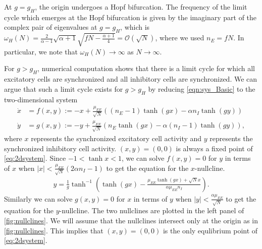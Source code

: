 \documentclass[11pt,reqno]{amsart}
\begin{document}
At $g = g_H$, the origin undergoes a Hopf bifurcation. The frequency of the limit cycle which emerges at the Hopf bifurcation is given by the imaginary part of the complex pair of eigenvalues at $g = g_H$, which is $\omega_H(N) = \frac{2}{\alpha-1}\sqrt{\alpha+1}\sqrt{f N- \frac{\alpha+1}{4}} = \mathcal{O}(\sqrt{N})$, where we used $n_E = f N$. In particular, we note that $\omega_H(N) \rightarrow \infty$ as $N \rightarrow \infty$.

For $g > g_H$, numerical computation shows that there is a limit cycle for which all excitatory cells are synchronized and all inhibitory cells are synchronized. We can argue that such a limit cycle exists for $g > g_H$ by reducing \cref{eqn:sys_Basic} to the two-dimensional system
\begin{equation}\label{eq:2dsystem}
\begin{aligned}
\dot{x} &= f(x, y) := -x + \frac{\mu_{EE}}{\sqrt{N}}\left((n_E - 1) \tanh(g x) - \alpha n_I \tanh(g y) \right) \\
\dot{y} &= g(x, y) := -y + \frac{\mu_{EE}}{\sqrt{N}}\left( n_E \tanh(g x) - \alpha (n_I - 1) \tanh(g y) \right), 
\end{aligned}
\end{equation}
where $x$ represents the synchronized excitatory cell activity and $y$ represents the synchronized inhibitory cell activity. $(x, y) = (0, 0)$ is always a fixed point of \cref{eq:2dsystem}. Since $-1 < \tanh x < 1$, we can solve $f(x, y) = 0$ for $y$ in terms of $x$ when $|x| < \frac{\mu_{EE}}{\sqrt{N}}( 2 \alpha n_I - 1)$ to get the equation for the $x$-nullcline.
\begin{align*}
y = \frac{1}{g} \tanh ^{-1} \left( \tanh (g x) - \frac{ \mu_{EE} \tanh (g x) + \sqrt{N} x}{\alpha \mu_{EE} n_I} \right).
\end{align*}
Similarly we can solve $g(x, y) = 0$ for $x$ in terms of $y$ when $|y| < \frac{\alpha \mu_{EE}}{\sqrt{N}}$ to get the equation for the $y$-nullcline. The two nullclines are plotted in the left panel of \cref{fig:nullclines}. We will assume that the nullclines intersect only at the origin as in \cref{fig:nullclines}. This implies that $(x,y) = (0,0)$ is the only equlibrium point of \cref{eq:2dsystem}. 
\end{document}
